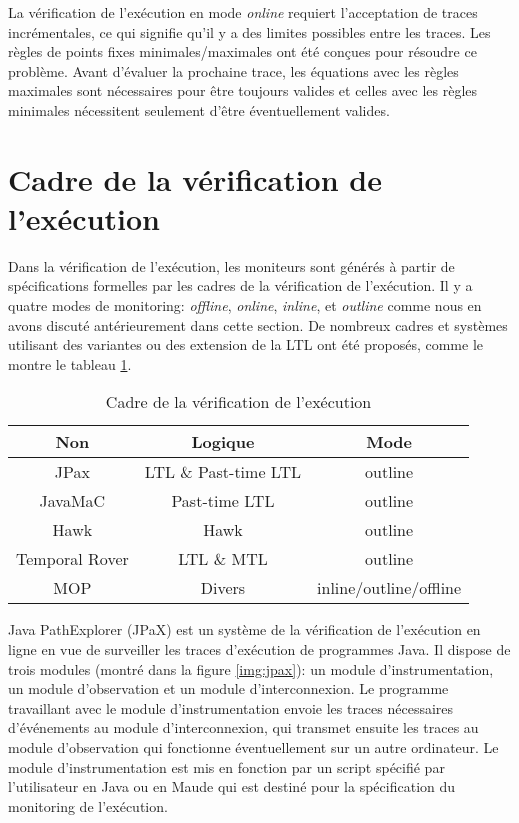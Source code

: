 La vérification de l'exécution en mode \emph{online} requiert l'acceptation de traces incrémentales, ce qui signifie qu'il y a des limites possibles entre les traces. Les règles de points fixes minimales/maximales ont été conçues pour résoudre ce problème. Avant d'évaluer la prochaine trace, les équations avec les règles maximales sont nécessaires pour être toujours valides et celles avec les règles minimales nécessitent seulement d'être éventuellement valides.

\section{Cadre de la vérification de l'exécution}\label{sec:rv:frameworks}

Dans la vérification de l'exécution, les moniteurs sont générés à partir de spécifications formelles par les cadres de la vérification de l'exécution. Il y a quatre modes de monitoring: \emph{offline}, \emph{online}, \emph{inline}, et \emph{outline} comme nous en avons discuté antérieurement dans cette section. De nombreux cadres et systèmes utilisant des variantes ou des extension de la LTL ont été proposés, comme le montre le tableau \ref{table:rvframeworks}.

\begin{table}[h]
\centering
\begin{tabular}{|c|c|c|}
\hline
Non & Logique & Mode \\
\hline
JPax\citep{havelund2001java} & LTL \& Past-time LTL & outline \\
\hline
JavaMaC\citep{kim2004java} & Past-time LTL & outline \\
\hline
Hawk \citep{d2005event} & Hawk & outline \\
\hline
Temporal Rover\citep{drusinsky2000temporal} & LTL \& MTL & outline \\
\hline
MOP \citep{chen2007mop} & Divers & inline/outline/offline \\
\hline
\end{tabular}
\caption{Cadre de la vérification de l'exécution}
\label{table:rvframeworks}
\end{table}

Java PathExplorer (JPaX) \citep{havelund2001java} est un système de la vérification de l'exécution en ligne en vue de surveiller les traces d'exécution de programmes Java. Il dispose de trois modules (montré dans la figure \ref{img:jpax}): un module d'instrumentation, un module d'observation et un module d'interconnexion. Le programme travaillant avec le module d'instrumentation envoie les traces nécessaires d'événements au module d'interconnexion, qui transmet ensuite les traces au module d'observation qui fonctionne éventuellement sur un autre ordinateur. Le module d'instrumentation est mis en fonction par un script spécifié par l'utilisateur en Java ou en Maude qui est destiné pour la spécification du monitoring de l'exécution.

